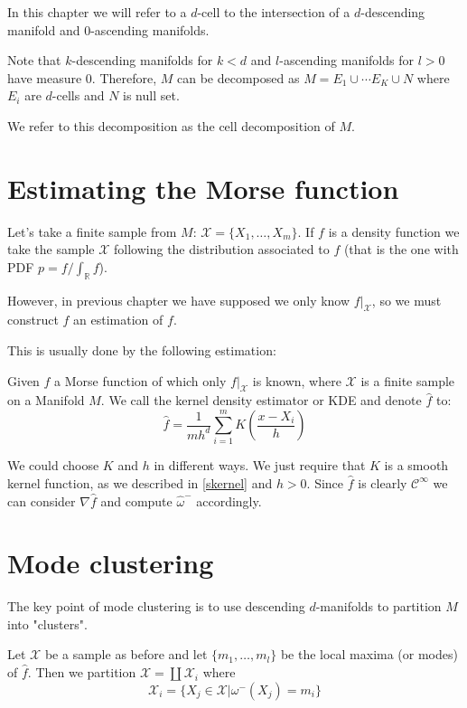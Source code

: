 \begin{definition}[$d$-cell]
    \label{cell}
    In this chapter we will refer to a $d$-cell to the intersection of a $d$-descending manifold
    and $0$-ascending manifolds.
\end{definition}

Note that $k$-descending manifolds for $k<d$ and $l$-ascending manifolds for $l>0$
have measure $0$. Therefore, $M$ can be decomposed as $M=E_1\cup\cdots E_K\cup N$ where $E_i$ 
are $d$-cells and $N$ is null set.

We refer to this decomposition as the cell decomposition of $M$.
\section{Estimating the Morse function}
Let's take a finite sample from $M$: $\mathcal{X}=\{X_1,\ldots,X_m\}$. 
If $f$ is a density function we take the sample $\mathcal{X}$ following the distribution associated to $f$ (that is 
the one with PDF $p=f/\int_\mathbb{R} f$).

However, in previous chapter we have supposed we only know $f\vert_\mathcal{X}$, so we must construct
$\hat{f}$ an estimation of $f$.

This is usually done by the following estimation:

\begin{definition}[KDE]
\label{kde}
Given $f$ a Morse function of which only $f\vert_\mathcal{X}$ is known, where $\mathcal{X}$ 
is a finite sample on a Manifold $M$.
We call the kernel density estimator or KDE and denote $\hat{f}$ to:
$$
\hat{f}=
\frac{1}{mh^d}
\sum_{i=1}^m
K\left(
\frac{x-X_i}{h}
\right)
$$
\end{definition}

We could choose $K$ and $h$ in different ways. We just require that $K$ is a smooth kernel function, as we
described in \ref{skernel} and $h>0$.
Since $\hat{f}$ is clearly $\mathcal{C}^\infty$
we can consider $\nabla\hat{f}$ and compute $\hat\omega^-$
accordingly.



\section{Mode clustering}
The key point of mode clustering is to use descending $d$-manifolds to partition $M$ into "clusters".

Let $\mathcal{X}$ be a sample as before and let $\{m_1,\ldots,m_l\}$ be the local maxima (or modes) of $\hat{f}$. Then we partition $\mathcal{X}=\coprod\mathcal{X}_i$
where 
$$
\mathcal{X}_i
=
\{
    X_j\in\mathcal{X}\vert \omega^-(X_j)=m_i
\}
$$

